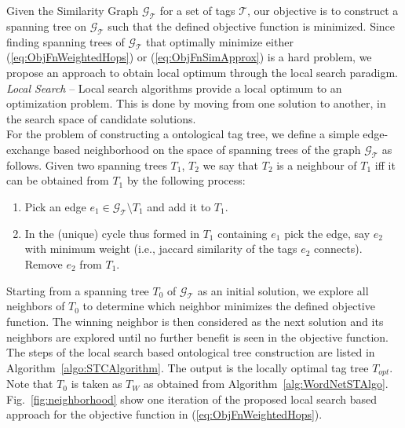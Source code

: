 Given the Similarity Graph $\mathcal{G_T}$ for a set of tags $\mathcal{T}$, our objective is to construct a spanning tree on $\mathcal{G_T}$ such that the defined objective function is minimized. Since finding spanning trees of $\mathcal{G_T}$ that optimally minimize either (\ref{eq:ObjFnWeightedHops}) or (\ref{eq:ObjFnSimApprox}) is a hard problem, we propose an approach to obtain local optimum through the local search paradigm. 
\\
\indent \textit{Local Search} -- Local search algorithms provide a local optimum to an optimization problem. This is done by moving from one solution to another, in the search space of candidate solutions. \\
For the problem of constructing a ontological tag tree, we define a simple edge-exchange based  neighborhood on the space of spanning trees of the graph $\mathcal{G_T}$ as follows. Given two spanning trees $T_1$, $T_2$ we say that $T_2$ is a neighbour of $T_1$ iff it can be obtained from $T_1$ by the following process:
\begin{enumerate}
	\item Pick an edge $e_1 \in \mathcal{G_T}\setminus T_1$ and add it to $T_1$. 
	\item In the (unique) cycle thus formed in $T_1$ containing $e_1$ pick the edge, say $e_2$ with minimum weight (i.e., jaccard similarity of the tags $e_2$ connects). Remove $e_2$ from $T_1$. 
\end{enumerate}
Starting from a spanning tree $T_0$ of $\mathcal{G_T}$ as an initial solution, we explore all neighbors of $T_0$ to determine which neighbor minimizes the defined objective function. The winning neighbor is then considered as the next solution and its neighbors are explored until no further benefit is seen in the objective function. The steps of the local search based ontological tree construction are listed in Algorithm~\ref{algo:STCAlgorithm}. The output is the locally optimal tag tree $T_{opt}$. Note that $T_0$ is taken as $T_W$ as obtained from Algorithm~\ref{alg:WordNetSTAlgo}. Fig.~\ref{fig:neighborhood} show one iteration of the proposed local search based approach for the objective function in (\ref{eq:ObjFnWeightedHops}). 
